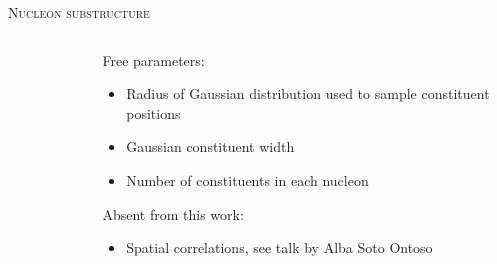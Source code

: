 \documentclass[aspectratio=169]{beamer}
\begin{document}
\begin{frame}[t, plain]{\scshape Nucleon substructure}
\begin{columns}[t]
\begin{column}{.23\textwidth}
\begin{figure}
      \end{figure}
    \end{column}
    \begin{column}{.37\textwidth}
      \centering
      \textcolor{theme}{Free parameters:}\\[1ex]
      \begin{itemize}
        \small
        \item Radius of Gaussian distribution used to sample
          constituent positions
        \item Gaussian constituent width
        \item Number of constituents in each nucleon
      \end{itemize}
      \bigskip
      \textcolor{theme}{Absent from this work:}\\[1ex]
      \begin{itemize}
        \small
        \item Spatial correlations,
          see talk by Alba Soto Ontoso
      \end{itemize}
    \end{column}
  \end{columns}
\end{frame}
\end{document}
